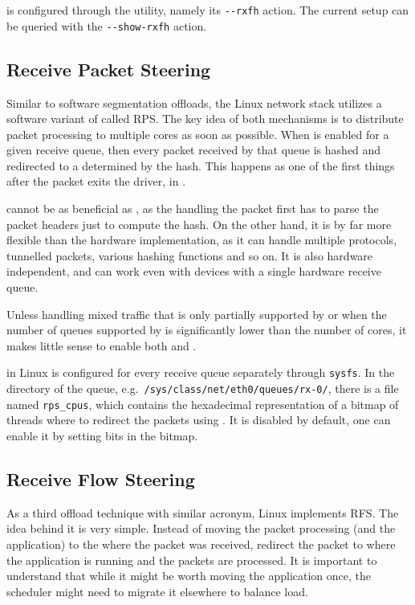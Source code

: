  is configured through the  utility, namely its
\Verb|--rxfh| action. The current setup can be queried with the
\Verb|--show-rxfh| action.

\subsection{Receive Packet Steering}
\label{sec:rps}

Similar to software segmentation offloads, the Linux network stack utilizes
a software variant of  called \acrfull{RPS}. The key idea of both mechanisms is to
distribute packet processing to multiple cores as soon as possible. When
 is enabled for a given receive queue, then every packet received by
that queue is hashed and redirected to a  determined by the hash. This
happens as one of the first things after the packet exits the  driver,
in .

 cannot be as beneficial as , as the  handling the
packet first has to parse the packet headers just to compute the hash.
On the other hand, it is by far more flexible than the hardware implementation,
as it can handle multiple protocols, tunnelled packets, various hashing
functions and so on. It is also hardware independent, and can work even with
devices with a single hardware receive queue.

Unless handling mixed traffic that is only partially supported by  or
when the number of queues supported by  is significantly lower than the number of
 cores, it makes little sense to enable both  and .

 in Linux is configured for every receive queue separately through
\texttt{sysfs}. In the directory of the queue,
e.g.\ \texttt{/sys/class/net/eth0/queues/rx-0/}, there is a file named
\texttt{rps\_cpus}, which contains the hexadecimal representation of a bitmap of
 threads where to redirect the packets using . It is disabled by
default, one can enable it by setting bits in the bitmap.

\subsection{Receive Flow Steering}

As a third offload technique with similar acronym, Linux implements \acrfull{RFS}.
The idea behind it is very simple. Instead of moving the packet processing (and
the application) to the  where the packet was received, redirect the
packet to where the application is running and the packets are processed. It is
important to understand that while it might be worth moving the application
once, the scheduler might need to migrate it elsewhere to balance load.

